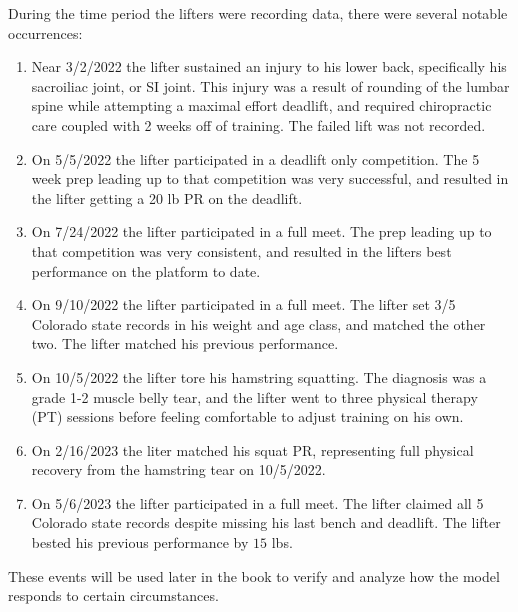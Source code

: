 During the time period the lifters were recording data, there were several notable occurrences:

\begin{enumerate}
    \item Near 3/2/2022 the lifter sustained an injury to his lower back, specifically his sacroiliac joint, or SI joint. This injury was a result of rounding of the lumbar spine while attempting a maximal effort deadlift, and required chiropractic care coupled with 2 weeks off of training. The failed lift was not recorded.
    
    \item On 5/5/2022 the lifter participated in a deadlift only competition. The 5 week prep leading up to that competition was very successful, and resulted in the lifter getting a 20 lb PR on the deadlift.
    
    \item On 7/24/2022 the lifter participated in a full meet. The prep leading up to that competition was very consistent, and resulted in the lifters best performance on the platform to date.
    
   	\item On 9/10/2022 the lifter participated in a full meet. The lifter set 3/5 Colorado state records in his weight and age class, and matched the other two. The lifter matched his previous performance.
    
    \item On 10/5/2022 the lifter tore his hamstring squatting. The diagnosis was a grade 1-2 muscle belly tear, and the lifter went to three physical therapy (PT) sessions before feeling comfortable to adjust training on his own.
    
    \item On 2/16/2023 the liter matched his squat PR, representing full physical recovery from the hamstring tear on 10/5/2022.
    
    \item On 5/6/2023 the lifter participated in a full meet. The lifter claimed all 5 Colorado state records despite missing his last bench and deadlift. The lifter bested his previous performance by $15$ lbs.
\end{enumerate}

These events will be used later in the book to verify and analyze how the model responds to certain circumstances.


